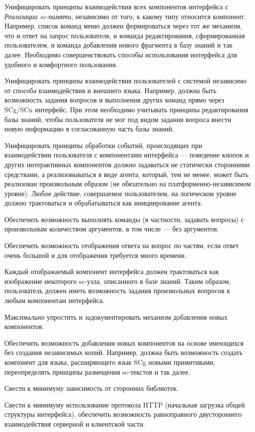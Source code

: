 \begin{textitemize}
	\item Унифицировать принципы взаимодействия всех компонентов интерфейса с \textit{Реализации sc-памяти}, независимо от того, к какому типу относится компонент. Например, список команд меню должен формироваться через тот же механизм, что и ответ на запрос пользователя, и команда редактирования, сформированная пользователем, и команда добавления нового фрагмента в базу знаний и так далее. Необходимо совершенствовать способы использования интерфейса для удобного и комфортного пользования.
	\item Унифицировать принципы взаимодействия пользователей с системой независимо от способа взаимодействия и внешнего языка. Например, должна быть возможность задания вопросов и выполнения других команд прямо через SCg/SCn интерфейс. При этом необходимо учитывать принципы редактирования базы знаний, чтобы пользователя не мог под видом задания вопроса внести новую информацию в согласованную часть базы знаний.
	\item Унифицировать принципы обработки событий, происходящих при взаимодействии пользователя с компонентами интерфейса --- поведение кнопок и других интерактивных компонентов должно задаваться не статически сторонними средствами, а реализовываться в виде агента, который, тем не менее, может быть реализован произвольным образом (не обязательно на платформенно-независимом уровне). Любое действие, совершаемое пользователем, на логическом уровне должно трактоваться и обрабатываться как инициирование агента.
	\item Обеспечить возможность выполнять команды (в частности, задавать вопросы) с произвольным количеством аргументов, в том числе --- без аргументов.
	\item Обеспечить возможность отображения ответа на вопрос по частям, если ответ очень большой и для отображения требуется много времени.
	\item Каждый отображаемый компонент интерфейса должен трактоваться как изображение некоторого sc-узла, описанного в базе знаний. Таким образом, пользователь должен иметь возможность задания произвольных вопросов к любым компонентам интерфейса.
	\item Максимально упростить и задокументировать механизм добавления новых компонентов.
	\item Обеспечить возможность добавления новых компонентов на основе имеющихся без создания независимых копий. Например, должна быть возможность создать компонент для языка, расширяющего язык SCg новыми примитивами, переопределять принципы размещения sc-текстов и так далее.
	\item Свести к минимуму зависимость от сторонних библиотек.
	\item Свести к минимуму использование протокола HTTP (начальная загрузка общей структуры интерфейса), обеспечить возможность равноправного двустороннего взаимодействия серверной и клиентской части.
\end{textitemize}

